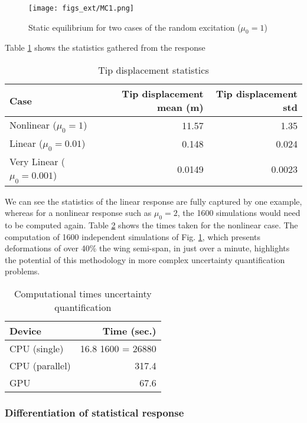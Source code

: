 \documentclass[11pt]{article}
\begin{document}
\begin{figure}[htbp]
\centering
\texttt{[image: figs\_ext/MC1.png]}
\caption{\label{fig:org5298a7f}Static equilibrium for two cases of the random excitation (\(\mu_0=1\))}
\end{figure}

Table \ref{tab:org4a9ec01} shows the statistics gathered from the response
\begin{table}[htbp]
\caption{\label{tab:org4a9ec01}Tip displacement statistics}
\centering
\begin{tabular}{lrr}
Case & Tip displacement mean (m) & Tip displacement std\\[0pt]
\hline
Nonlinear (\(\mu_0 = 1\)) & 11.57 & 1.35\\[0pt]
Linear (\(\mu_0 = 0.01\)) & 0.148 & 0.024\\[0pt]
Very Linear (\(\mu_0 = 0.001\)) & 0.0149 & 0.0023\\[0pt]
\end{tabular}
\end{table}

We can see the statistics of the linear response are fully captured by one example, whereas for a nonlinear response such as \(\mu_0 = 2\), the 1600 simulations would need to be computed again. Table \ref{tab:orgb9e277e} shows the times taken for the nonlinear case. The computation of 1600 independent simulations of Fig. \ref{fig:org5298a7f}, which presents deformations of over 40\% the wing semi-span, in just over a minute, highlights the potential of this methodology in more complex uncertainty quantification problems.  

\begin{table}[htbp]
\caption{\label{tab:orgb9e277e}Computational times uncertainty quantification}
\centering
\begin{tabular}{lr}
Device & Time (sec.)\\[0pt]
\hline
CPU (single) & 16.8 \texttimes{} 1600 = 26880\\[0pt]
CPU (parallel) & 317.4\\[0pt]
GPU & 67.6\\[0pt]
\end{tabular}
\end{table}

\subsubsection{Differentiation of statistical response}
\label{sec:org97aef95}
\end{document}
